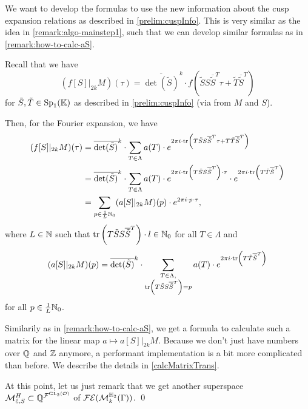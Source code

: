 \begin{remark}
\label{remark:algo-mainstep2}
We want to develop the formulas to use the new information about the cusp expansion relations as described in \cref{prelim:cuspInfo}. This is very similar as the idea in \cref{remark:algo-mainstep1}, such that we can develop similar formulas as in \cref{remark:how-to-calc-aS}.

Recall that we have
\[ (f[S] |_{2k} M) (\tau) = \overline{\det(\tilde{S})}^k \cdot f\left( \tilde{S} S \overline{\tilde{S}}^T \tau + \tilde{T} \overline{\tilde{S}}^T \right) \]
for $\tilde{S}, \tilde{T} \in \operatorname{Sp}_1(\mathbb{K})$ as described in \cref{prelim:cuspInfo} (via  from $M$ and $S$).

Then, for the Fourier expansion, we have
\begin{align*}
(f[S] |_{2k} M) (\tau)
&= \overline{\det(\tilde{S})}^k \cdot \sum_{T \in \Lambda} a(T) \cdot e^{2 \pi i \cdot \textup{\textrm{tr}}\left(T \tilde{S} S \overline{\tilde{S}}^T \tau + T \tilde{T} \overline{\tilde{S}}^T\right)} \\
&= \overline{\det(\tilde{S})}^k \cdot \sum_{T \in \Lambda} a(T) \cdot e^{2 \pi i \cdot \textup{\textrm{tr}}\left(T \tilde{S} S \overline{\tilde{S}}^T\right) \cdot \tau} \cdot e^{2 \pi i \cdot \textup{\textrm{tr}}\left(T \tilde{T} \overline{\tilde{S}}^T\right)} \\
&= \sum_{p \in \frac{1}{L} \mathbb{N}_0} (a[S]|_{2k} M) (p) \cdot e^{2 \pi i \cdot p \cdot \tau} ,
\end{align*}
where $L \in \mathbb{N}$ such that $\textup{\textrm{tr}}\left(T \tilde{S} S \overline{\tilde{S}}^T\right) \cdot l \in \mathbb{N}_0$ for all $T \in \Lambda$ and
\[ (a[S]|_{2k} M) (p) = \overline{\det(\tilde{S})}^k \cdot \sum_{\begin{subarray}{c}
T \in \Lambda,\\
\textup{\textrm{tr}}\left(T \tilde{S} S \overline{\tilde{S}}^T\right) = p
\end{subarray}} a(T) \cdot e^{2 \pi i \cdot \textup{\textrm{tr}}\left(T \tilde{T} \overline{\tilde{S}}^T\right)} \]
for all $p \in \frac{1}{L} \mathbb{N}_0$.

Similarily as in \cref{remark:how-to-calc-aS}, we get a formula to calculate such a matrix for the linear map $a \mapsto a[S]|_{2k} M$. Because we don't just have numbers over $\mathbb{Q}$ and $\mathbb{Z}$ anymore, a performant implementation is a bit more complicated than before. We describe the details in \cref{calcMatrixTrans}.

At this point, let us just remark that we get another superspace $\mathcal{M}^H_{\hat{c},S} \subset \mathbb{Q}^{{\mathcal{F}}^{\operatorname{GL}_2(\mathcal{O})}}$ of $\mathcal{FE}(\operatorname{\mathcal{M}}^{\mathbb{H}_{2}}_{k} (\Gamma))$. \qed
\end{remark}

